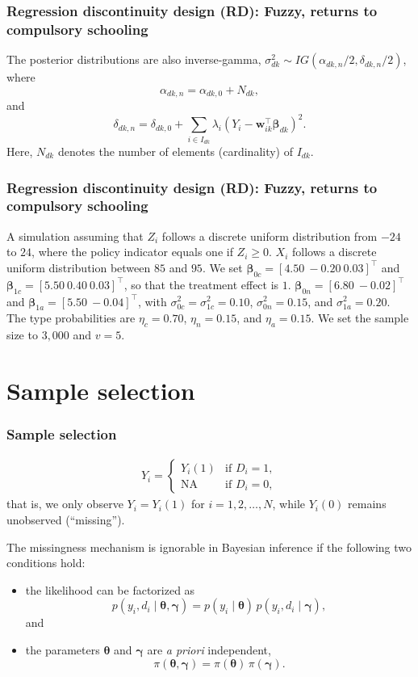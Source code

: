 \documentclass[12pt, compress]{beamer}
\begin{document}
\begin{frame}
	\frametitle{Regression discontinuity design (RD): Fuzzy, returns to compulsory schooling}
The posterior distributions are also inverse-gamma, $\sigma_{dk}^2 \sim IG(\alpha_{dk,n}/2, \delta_{dk,n}/2)$, where
\[
\alpha_{dk,n} = \alpha_{dk,0} + N_{dk},
\]
and
\[
\delta_{dk,n} = \delta_{dk,0} + \sum_{i \in I_{dk}} \lambda_i \left(Y_i - \mathbf{w}_{ik}^{\top} \boldsymbol{\beta}_{dk} \right)^2.
\]
Here, $N_{dk}$ denotes the number of elements (cardinality) of $I_{dk}$.
\end{frame}

\begin{frame}
	\frametitle{Regression discontinuity design (RD): Fuzzy, returns to compulsory schooling}
A simulation assuming that $Z_i$ follows a discrete uniform distribution from $-24$ to $24$, where the policy indicator equals one if $Z_i \geq 0$. $X_i$ follows a discrete uniform distribution between $85$ and $95$. We set $\boldsymbol{\beta}_{0c} = [4.50 \ -0.20 \ 0.03]^{\top}$ and $\boldsymbol{\beta}_{1c} = [5.50 \ 0.40 \ 0.03]^{\top}$, so that the treatment effect is $1$. $\boldsymbol{\beta}_{0n} = [6.80 \ -0.02]^{\top}$ and $\boldsymbol{\beta}_{1a} = [5.50 \ -0.04]^{\top}$, with $\sigma_{0c}^2 = \sigma_{1c}^2 = 0.10$, $\sigma_{0n}^2 = 0.15$, and $\sigma_{1a}^2 = 0.20$. The type probabilities are $\eta_{c} = 0.70$, $\eta_{n} = 0.15$, and $\eta_{a} = 0.15$. We set the sample size to $3{,}000$ and $v = 5$.
\end{frame}

\section{Sample selection}
\begin{frame}
	\frametitle{Sample selection}
\begin{align*}
	Y_i = \begin{cases}
		Y_i(1) & \text{if } D_i=1, \\
		\text{NA} & \text{if } D_i=0,
	\end{cases}
\end{align*}
that is, we only observe $Y_i = Y_i(1)$ for $i=1,2,\dots,N$, while $Y_i(0)$ remains unobserved (``missing'').

The missingness mechanism is ignorable in Bayesian inference if the following two conditions hold:
  \begin{itemize}
      \item the likelihood can be factorized as
\[
p(y_i, d_i\mid \boldsymbol{\theta},\boldsymbol{\gamma}) 
= p(y_i\mid \boldsymbol{\theta})\, p(y_i,d_i \mid \boldsymbol{\gamma}),
\] 
and 
\item the parameters $\boldsymbol{\theta}$ and $\boldsymbol{\gamma}$ are \emph{a priori} independent,
\[
\pi(\boldsymbol{\theta},\boldsymbol{\gamma}) 
= \pi(\boldsymbol{\theta})\,\pi(\boldsymbol{\gamma}).
\]
  \end{itemize}
\end{frame}
\end{document}
